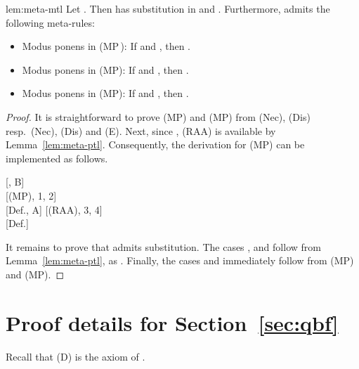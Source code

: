 \documentclass[a4paper,english,fleqn,11pt,final]{scrartcl}
\newcommand{\negg}{{\sim}}
\newcommand{\timp}{\rightarrowtriangle}
\newcommand{\Deriv}[1]{{\normalfont\textsf{#1}}}
\theoremstyle{plain}
\theoremstyle{definition}
\newcommand{\thm}{\text{\scriptsize\; (thm)}}
\begin{document}
\begin{replemma}{lem:meta-mtl}
Let .
Then  has substitution in  and .
Furthermore,  admits the following meta-rules:
\begin{itemize}
	\item Modus ponens in  \Deriv{(MP\,)}:
	If  and , then .
	\item Modus ponens in  \Deriv{(MP)}:
	If  and , then .
	\item Modus ponens in  \Deriv{(MP)}:
	If  and , then .
\end{itemize}
\end{replemma}
\begin{proof}
It is straightforward to prove \Deriv{(MP)} and \Deriv{(MP)} from \Deriv{(Nec)}, \Deriv{(Dis)} resp.\ \Deriv{(Nec)}, \Deriv{(Dis)} and \Deriv{(E)}.
Next, since , \Deriv{(RAA)} is available by Lemma~\ref{lem:meta-ptl}.
Consequently, the derivation for \Deriv{(MP)} can be implemented as follows.

\smallskip

{
\setlength{\fitchprfwidth}{1.5in}

\fitchprf{
\pline[A ]{\Diamond \varphi}\\
\pline[B ]{\varphi \timp \psi \thm}
}
{
\pline[1 ]{\negg \psi \timp \negg \varphi \thm}[, B]\\
\subproof{\pline[2 ]{\triangle \negg \psi}}
{
\pline[3 ]{\triangle \negg \varphi}[\Deriv{(MP)}, 1, 2]\\
\pline[4 ]{\negg \triangle \negg \varphi}[Def., A]
}
\pline[5 ]{\negg\triangle\negg\psi}[\Deriv{(RAA)}, 3, 4]\\
\pline[\slider]{\Diamond\psi }[Def.]
}
}

\medskip

It remains to prove that  admits substitution.
The cases ,  and  follow from Lemma~\ref{lem:meta-ptl}, as .
Finally, the cases  and  immediately follow from \Deriv{(MP)} and \Deriv{(MP)}.
\end{proof}
 
\section{Proof details for Section~\ref{sec:qbf}}

Recall that \Deriv{(D)} is the axiom
 of .
\end{document}
